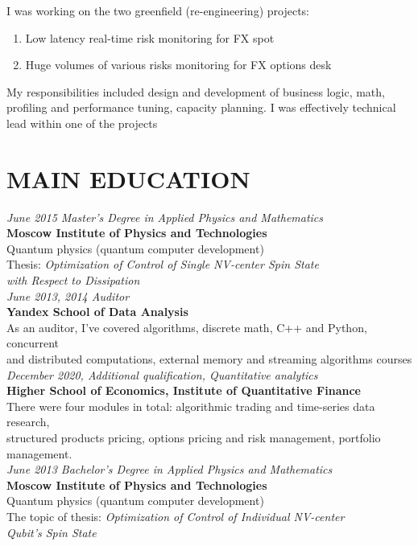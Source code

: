 \documentclass[margin,12pt]{res}
\begin{document}
\begin{resume}
I was working on the two greenfield (re-engineering) projects:
\begin{enumerate}
    \item Low latency real-time risk monitoring for FX spot 
    \vspace{-5pt}
    \item Huge volumes of various risks monitoring for FX options desk
\end{enumerate}
\vspace{-14pt}
My responsibilities included design and development of business logic, math,\\ 
profiling and performance tuning, capacity planning. I was effectively technical\\
 lead within one of the projects

\section{MAIN EDUCATION}
\textit{June 2015 Master's Degree in Applied Physics and Mathematics\\}
\textbf{Moscow Institute of Physics and Technologies}\\
Quantum physics (quantum computer development)\\
Thesis: \textit{Optimization of Control of Single NV-center Spin State\\
	with Respect to Dissipation}\\
\newline
\textit{June 2013, 2014 Auditor\\}
\textbf{Yandex School of Data Analysis}\\
As an auditor, I've covered algorithms, discrete math, C++ and Python,
concurrent\\ and distributed computations,
external memory and streaming algorithms courses\\
\newline
\textit{December 2020, Additional qualification, Quantitative analytics\\}
\textbf{Higher School of Economics, Institute of Quantitative Finance}\\
There were four modules in total: algorithmic trading and time-series data research,\\
structured products pricing, options pricing and risk management, portfolio\\
	management.\\
\newline
\textit{June 2013 Bachelor's Degree in Applied Physics and Mathematics\\}
\textbf{Moscow Institute of Physics and Technologies}\\
Quantum physics (quantum computer development)\\
The topic of thesis: \textit{Optimization of Control of Individual NV-center\\ 
Qubit's Spin State}


\end{resume}
\end{document}

